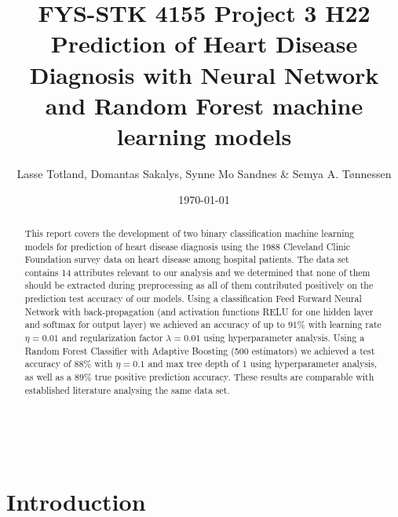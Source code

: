 \documentclass[reprint,english,notitlepage]{revtex4-1}  %
\begin{document}
\title{FYS-STK 4155 Project 3 H22\\
Prediction of Heart Disease Diagnosis with Neural Network and Random Forest machine learning models} \\ 
\large{}
\author{Lasse Totland, Domantas Sakalys, Synne Mo Sandnes & Semya A. Tønnessen}
\date{\today}      %
\noaffiliation                            %
\begin{abstract} 
This report covers the development of two binary classification machine learning models for prediction of heart disease diagnosis using the 1988 Cleveland Clinic Foundation survey data on heart disease among hospital patients. The data set contains 14 attributes relevant to our analysis and we determined that none of them should be extracted during preprocessing as all of them contributed positively on the prediction test accuracy of our models. Using a classification Feed Forward Neural Network with back-propagation (and activation functions RELU for one hidden layer and softmax for output layer) we achieved an accuracy of up to $91\%$ with learning rate $\eta = 0.01$ and regularization factor $\lambda = 0.01$ using hyperparameter analysis. Using a Random Forest Classifier with Adaptive Boosting (500 estimators) we achieved a test accuracy of $88\%$ with $\eta = 0.1$ and max tree depth of $1$ using hyperparameter analysis, as well as a $89\%$ true positive prediction accuracy. These results are comparable with established literature analysing the same data set.
\end{abstract}                           

\maketitle                                %



\section{Introduction}
\end{document}
